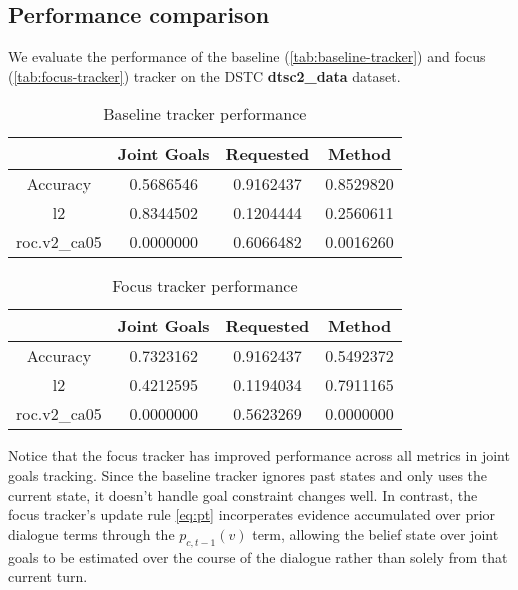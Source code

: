 \documentclass[a4paper,oneside,reqno]{amsart}
\begin{document}


\subsection{Performance comparison}

We evaluate the performance of the baseline (\autoref{tab:baseline-tracker})
and focus (\autoref{tab:focus-tracker}) tracker on the DSTC \textbf{dtsc2\_data}
dataset.

\begin{table}[ht!]
  \begin{tabular}{cccc}
    \toprule
                  &   Joint Goals   &    Requested    &      Method    \\
    \midrule
    Accuracy      &    0.5686546    &    0.9162437    &    0.8529820   \\
    l2            &    0.8344502    &    0.1204444    &    0.2560611   \\
    roc.v2\_ca05  &    0.0000000    &    0.6066482    &    0.0016260   \\
    \bottomrule
  \end{tabular}
  \caption{Baseline tracker performance}
  \label{tab:baseline-tracker}
\end{table}

\begin{table}[ht!]
  \begin{tabular}{cccc}
    \toprule
                  &   Joint Goals   &    Requested    &      Method    \\
    \midrule
    Accuracy      &    0.7323162    &    0.9162437    &    0.5492372   \\
    l2            &    0.4212595    &    0.1194034    &    0.7911165   \\
    roc.v2\_ca05  &    0.0000000    &    0.5623269    &    0.0000000   \\
    \bottomrule
  \end{tabular}
  \caption{Focus tracker performance}
  \label{tab:focus-tracker}
\end{table}

Notice that the focus tracker has improved performance across all metrics in
joint goals tracking. Since the baseline tracker ignores past states and only
uses the current state, it doesn't handle goal constraint changes well.  In
contrast, the focus tracker's update rule \autoref{eq:pt} incorperates evidence
accumulated over prior dialogue terms through the $p_{c,t-1}(v)$ term, allowing
the belief state over joint goals to be estimated over the course of the
dialogue rather than solely from that current turn.
\end{document}
